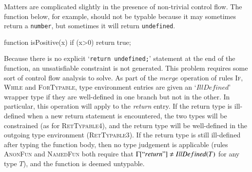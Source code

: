 \documentclass[12pt,a4paper,twoside,openright]{report}
\theoremstyle{definition}
\theoremstyle{dotless}
\newcommand*{\js}{\texttt}
\begin{document}
Matters are complicated slightly in the presence of non-trivial control flow.
The function below, for example, should not be typable because it may sometimes return
a \texttt{number}, but sometimes it will return \texttt{undefined}.
\begin{listing}[H]
  \begin{jscript}
	function isPositive(x) {
	  if (x>0) {
		return true;
	  }
	}
  \end{jscript}
\end{listing}

Because there is no explicit `\js{return undefined;}' statement at the end of the
function, an unsatisfiable constraint is not generated. This problem requires
some sort of control flow analysis to solve. As part of the $merge$ operation
of rules \textsc{If}, \textsc{While} and \textsc{ForTypable}, type environment
entries are given an `$IllDefined$' wrapper type if they are well-defined in
one branch but not in the other. In particular, this operation will apply to
the \textit{return} entry. If the return type is ill-defined when a new return
statement is encountered, the two types will be constrained (as for
\textsc{RetTypable4}), and the return type will be well-defined in the outgoing
type environment (\textsc{RetTypable3}).  If the return type is still
ill-defined after typing the function body, then no type judgement is
applicable (rules \textsc{AnonFun} and \textsc{NamedFun} both require that
$\Gamma[``return"]\neq IllDefined(T)$ for any type $T$), and the function is
deemed untypable.
\end{document}
